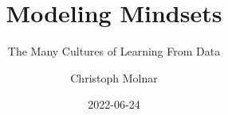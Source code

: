 \documentclass[
  10pt,
]{scrbook}
\title{Modeling Mindsets}
\subtitle{The Many Cultures of Learning From Data}
\author{Christoph Molnar}
\date{2022-06-24}
\begin{document}
\maketitle

\thispagestyle{empty}

\end{document}
